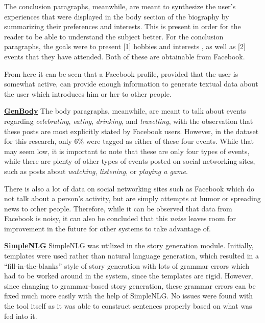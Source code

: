 The conclusion paragraphs, meanwhile, are meant to synthesize the user's experiences that were displayed in the body section of the biography by summarizing their preferences and interests. This is present in order for the reader to be able to understand the subject better. For the conclusion paragraphs, the goals were to present [1] hobbies and interests \cite{Youse2005}, as well as [2] events that they have attended. Both of these are obtainable from Facebook.

From here it can be seen that a Facebook profile, provided that the user is somewhat active, can provide enough information to generate textual data about the user which introduces him or her to other people.

\underline{\textbf{GenBody}} \newline
The body paragraphs, meanwhile, are meant to talk about events regarding \textit{celebrating}, \textit{eating}, \textit{drinking}, and \textit{travelling}, with the observation that these posts are most explicitly stated by Facebook users. However, in the dataset for this research, only 6\% were tagged as either of these four events. While that may seem low, it is important to note that these are only four types of events, while there are plenty of other types of events posted on social networking sites, such as posts about \textit{watching}, \textit{listening}, or \textit{playing a game}. 

There is also a lot of data on social networking sites such as Facebook which do not talk about a person's activity, but are simply attempts at humor or spreading news to other people. Therefore, while it can be observed that data from Facebook is noisy, it can also be concluded that this \textit{noise} leaves room for improvement in the future for other systems to take advantage of.

\underline{\textbf{SimpleNLG}} \newline
SimpleNLG was utilized in the story generation module. Initially, templates were used rather than natural language generation, which resulted in a ``fill-in-the-blanks” style of story generation with lots of grammar errors which had to be worked around in the system, since the templates are rigid. However, since changing to grammar-based story generation, these grammar errors can be fixed much more easily with the help of SimpleNLG. No issues were found with the tool itself as it was able to construct sentences properly based on what was fed into it. 

